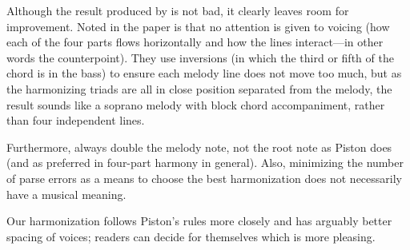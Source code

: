Although the result produced by \fharm is not bad, it clearly leaves
room for improvement. Noted in
the paper is that no attention is given to voicing (how each of the
four parts flows horizontally and how the lines interact---in other
words the counterpoint). They use inversions (in which the
third or fifth of the chord is in the bass) to ensure each melody line
does not move too much, but as the harmonizing triads are all in close
position separated from the melody, the result sounds like a soprano
melody with block chord accompaniment, rather than four independent
lines.

Furthermore, \fharm always double the melody note, not the root note
as Piston does (and as preferred in four-part harmony in general).
Also, minimizing the number of parse errors as a means
to choose the best harmonization does not necessarily have a musical
meaning.

Our harmonization follows Piston's rules more closely and has arguably
better spacing of voices; readers can decide for themselves which is
more pleasing.

